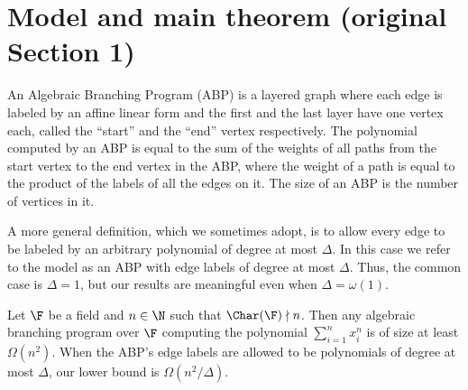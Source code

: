 \section*{Model and main theorem (original Section 1)}
\begin{definition}\label{def:abp}
An Algebraic Branching Program (ABP) is a layered graph where each edge is labeled by an affine linear form and the first and the last layer have one vertex each, called the ``start'' and the ``end'' vertex respectively.
The polynomial computed by an ABP is equal to the sum of the weights of all paths from the start vertex to the end vertex in the ABP, where the weight of a path is equal to the product of the labels of all the edges on it.
The size of an ABP is the number of vertices in it.
\end{definition}
A more general definition, which we sometimes adopt, is to allow every edge to be labeled by an arbitrary polynomial of degree at most $\Delta$. In this case we refer to the model as an ABP with edge labels of degree at most $\Delta$. Thus, the common case is $\Delta=1$, but our results are meaningful even when $\Delta=\omega(1)$.
\begin{theorem}\label{thm:intro main}
Let $\F$ be a field and $n\in\N$ such that $\Char(\F)\nmid n$. Then any algebraic branching program over $\F$ computing the polynomial $\sum_{i=1}^n x_i^n$ is of size at least $\Omega(n^2)$.
When the ABP's edge labels are allowed to be polynomials of degree at most $\Delta$, our lower bound is $\Omega(n^2/\Delta)$.
\end{theorem}
